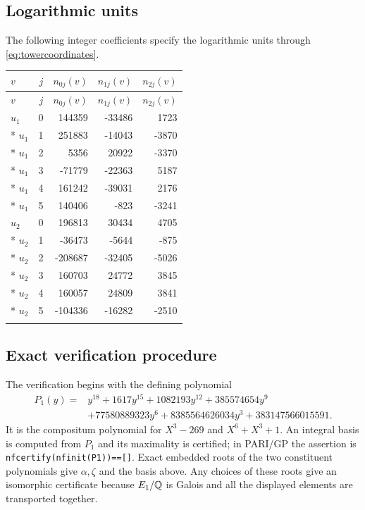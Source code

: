 \documentclass[11pt]{article}
\theoremstyle{remark}\newtheorem{remark}[theorem]{Remark}
\begin{document}
\subsection{Logarithmic units}
The following integer coefficients specify the logarithmic units through \eqref{eq:towercoordinates}.
{\small\setlength{\tabcolsep}{7pt}
\begin{longtable}{@{}lrrrr@{}}
\toprule
$v$&$j$&$n_{0j}(v)$&$n_{1j}(v)$&$n_{2j}(v)$\\\midrule
\endfirsthead
\toprule
$v$&$j$&$n_{0j}(v)$&$n_{1j}(v)$&$n_{2j}(v)$\\\midrule
\endhead
$u_1$&0&144359&-33486&1723\\*
$u_1$&1&251883&-14043&-3870\\*
$u_1$&2&5356&20922&-3370\\*
$u_1$&3&-71779&-22363&5187\\*
$u_1$&4&161242&-39031&2176\\*
$u_1$&5&140406&-823&-3241\\
\addlinespace[3pt]
$u_2$&0&196813&30434&4705\\*
$u_2$&1&-36473&-5644&-875\\*
$u_2$&2&-208687&-32405&-5026\\*
$u_2$&3&160703&24772&3845\\*
$u_2$&4&160057&24809&3841\\*
$u_2$&5&-104336&-16282&-2510\\
\addlinespace[3pt]
\bottomrule
\end{longtable}}
\subsection{Exact verification procedure}
The verification begins with the defining polynomial
\begin{align*}
P_1(y)={}&y^{18}+1617y^{15}+1082193y^{12}+385574654y^9\\
 &+77580889323y^6+8385564626034y^3+383147566015591.
\end{align*}
It is the compositum polynomial for $X^3-269$ and $X^6+X^3+1$.
An integral basis is computed from $P_1$ and its maximality is certified; in PARI/GP the assertion is \texttt{nfcertify(nfinit(P1))==[]}.
Exact embedded roots of the two constituent polynomials give $\alpha,\zeta$ and the basis above.
Any choices of these roots give an isomorphic certificate because $E_1/\mathbb Q$ is Galois and all the displayed elements are transported together.
\end{document}
